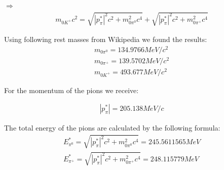 \documentclass[a4paper,parskip,11pt, DIV12]{scrreprt}
\begin{document}
	$\Rightarrow$
	\begin{align*}
		m_{0K^+}c^2 = \sqrt{|p^*_{\pi}|^2c^2 + m_{0\pi^0}^2c^4} + \sqrt{|p^*_{\pi}|^2c^2 + m_{0\pi^+}^2c^4}
	\end{align*}
	
	Using following rest masses from Wikipedia we found the results:
	\begin{align*}
		m_{0\pi^0} = 134.9766 MeV/c^2\\
		m_{0\pi^+} = 139.5702 MeV/c^2\\
		m_{0K^+} = 493.677 MeV/c^2
	\end{align*}
	
	For the momentum of the pions we receive:
	
	\begin{align*}
		|p^*_{\pi}| = 205.138 MeV/c
	\end{align*}
	
	The total energy of the pions are calculated by the following formula:
	\begin{align*}
		E_{\pi^0}^* = \sqrt{|p^*_{\pi}|^2c^2 + m_{0\pi^0}^2c^4} = 245.5611565 MeV\\
		E_{\pi^+}^* = \sqrt{|p^*_{\pi}|^2c^2 + m_{0\pi^+}^2c^4}= 248.115779 MeV
	\end{align*}
	
	
	\clearpage  
	
	
\end{document}
